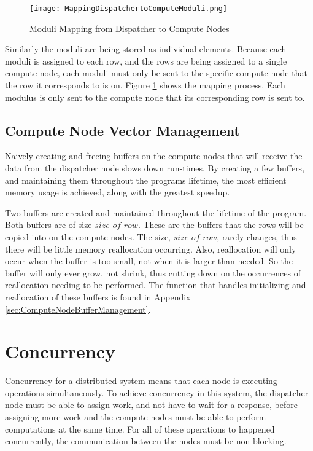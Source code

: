 \begin{figure}[htp]
\centering
\texttt{[image: MappingDispatchertoComputeModuli.png]}
\caption{Moduli Mapping from Dispatcher to Compute Nodes}
\label{fig:MappingDispatcherToComputeModuli}
\end{figure}
Similarly the moduli are being stored as individual elements. Because each moduli is assigned to each row, and the rows are being assigned to a single compute node, each moduli must only be sent to the specific compute node that the row it corresponds to is on. Figure \ref{fig:MappingDispatcherToComputeModuli} shows the mapping process. Each modulus is only sent to the compute node that its corresponding row is sent to.

\subsection{Compute Node Vector Management}
Naively creating and freeing buffers on the compute nodes that will receive the data from the dispatcher node slows down run-times. By creating a few buffers, and maintaining them throughout the programs lifetime, the most efficient memory usage is achieved, along with the greatest speedup.

Two buffers are created and maintained throughout the lifetime of the program. Both buffers are of size $size\_of\_row$. These are the buffers that the rows will be copied into on the compute nodes. The size, $size\_of\_row$, rarely changes, thus there will be little memory reallocation occurring. Also, reallocation will only occur when the buffer is too small, not when it is larger than needed. So the buffer will only ever grow, not shrink, thus cutting down on the occurrences of reallocation needing to be performed. The function that handles initializing and reallocation of these buffers is found in Appendix \ref{sec:ComputeNodeBufferManagement}.

\section{Concurrency} \label{sec:Concurrency}
Concurrency for a distributed system means that each node is executing operations simultaneously. To achieve concurrency in this system, the dispatcher node must be able to assign work, and not have to wait for a response, before assigning more work and the compute nodes must be able to perform computations at the same time. For all of these operations to happened concurrently, the communication between the nodes must be non-blocking.

